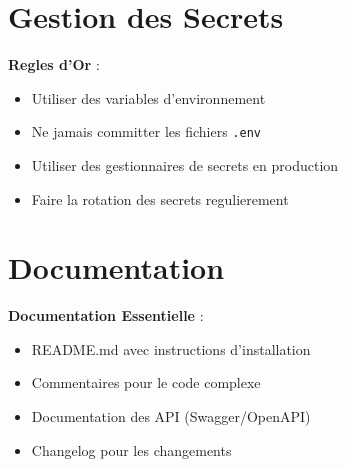 \documentclass[a4paper,12pt]{book}
\begin{document}
\section{Gestion des Secrets}

\begin{securitybox}
    \textbf{Regles d'Or} :
    \begin{itemize}
        \item Utiliser des variables d'environnement
        \item Ne jamais committer les fichiers \texttt{.env}
        \item Utiliser des gestionnaires de secrets en production
        \item Faire la rotation des secrets regulierement
    \end{itemize}
\end{securitybox}

\section{Documentation}

\begin{bestpracticebox}
    \textbf{Documentation Essentielle} :
    \begin{itemize}
        \item README.md avec instructions d'installation
        \item Commentaires pour le code complexe
        \item Documentation des API (Swagger/OpenAPI)
        \item Changelog pour les changements
    \end{itemize}
\end{bestpracticebox}


\end{document}
